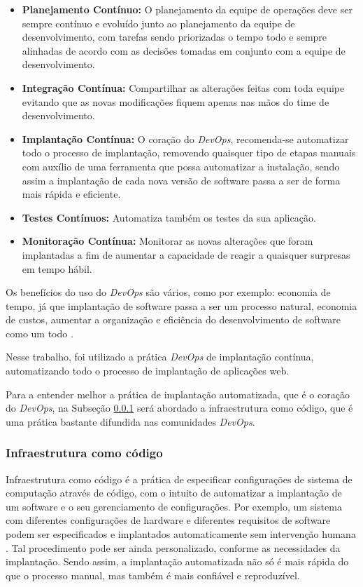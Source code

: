  \begin{itemize}
   \item \textbf{Planejamento Contínuo:} O planejamento da equipe de operações 
deve ser sempre contínuo
   e evoluído junto ao planejamento da equipe de desenvolvimento, com tarefas
   sendo priorizadas o tempo todo e sempre alinhadas de acordo com as decisões tomadas
   em conjunto com a equipe de desenvolvimento.
   \item \textbf{Integração Contínua:} Compartilhar as alterações feitas com toda equipe
   evitando que as novas modificações fiquem apenas nas mãos do time de desenvolvimento.
   \item \textbf{Implantação Contínua:} O coração do \textit{DevOps}, recomenda-se automatizar
   todo o processo de implantação, removendo quaisquer tipo de etapas manuais com auxílio
   de uma ferramenta que possa automatizar a instalação, sendo assim a implantação
   de cada nova versão de software passa a ser de forma mais rápida e eficiente.
   \item \textbf{Testes Contínuos:} Automatiza também os testes da sua aplicação.
   \item \textbf{Monitoração Contínua:} Monitorar as novas alterações
   que foram implantadas a fim de aumentar a capacidade de reagir a quaisquer surpresas
   em tempo hábil.
 \end{itemize}

 Os benefícios do uso do \textit{DevOps} são vários, como por exemplo: economia de tempo,
 já que implantação de software passa a ser um processo natural, economia de custos, aumentar
 a organização e eficiência do desenvolvimento de software como um todo \cite{7173368}.

Nesse trabalho, foi utilizado a prática \textit{DevOps} de implantação contínua,
automatizando todo o processo de implantação de aplicações web. 

Para a entender melhor a prática de implantação automatizada, que é o coração
do \textit{DevOps}, na Subseção \ref{subsub:infracode} será abordado a infraestrutura
como código, que é uma prática bastante difundida nas comunidades \textit{DevOps}.

\subsubsection{Infraestrutura como código}
\label{subsub:infracode}
Infraestrutura como código é a prática de especificar configurações de
sistema de computação através de código, com o intuito de automatizar a implantação
de um software e o seu gerenciamento de configurações. Por exemplo, um sistema
com diferentes configurações de hardware e diferentes
requisitos de software podem ser especificados e implantados automaticamente
sem intervenção humana \cite{configurationcodesmell}. Tal procedimento pode ser
ainda personalizado, conforme as necessidades da implantação. Sendo assim, a implantação
automatizada não só é mais rápida do que o processo manual, mas também é mais
confiável e reproduzível.

